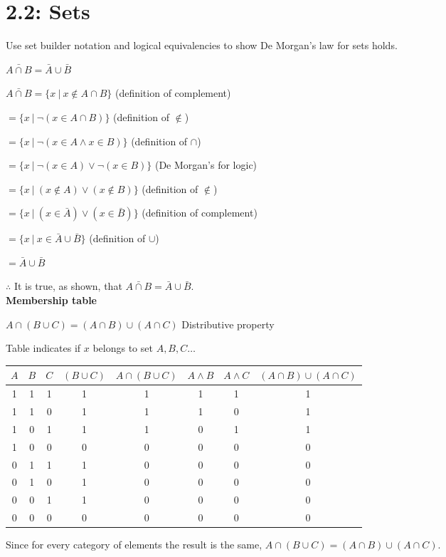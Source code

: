 \documentclass{exam}
\begin{document}
	
	\section{2.2: Sets}
	
	Use set builder notation and logical equivalencies to show De Morgan's law for sets holds.
	
	$\bar{A \cap B} = \bar{A} \cup \bar{B}$ 
	
	$\bar{A \cap B} = \{ x \ |\ x \notin A \cap B\} $  (definition of complement)
	
	$= \{ x \ |\ \neg(x \in A \cap B) \} $ (definition of $\notin$)
	
	$= \{ x \ |\ \neg(x \in A \wedge x \in B) \} $ (definition of $\cap$)
	
	$= \{ x \ |\ \neg(x \in A) \lor \neg(x \in B) \} $ (De Morgan's for logic)
	
	$= \{ x \ |\ (x \notin A) \lor (x \notin B) \} $ (definition of $\notin$)
	
	$= \{ x \ |\ (x \in \bar{A}) \lor (x \in \bar{B}) \} $ (definition of complement)
	
	$= \{ x \ |\ x \in \bar{A} \cup \bar{B} \} $ (definition of $\cup$)
	
	$= \bar{A} \cup \bar{B}$
	
	$\therefore$ It is true, as shown, that $\bar{A \cap B} = \bar{A} \cup \bar{B}$.\\
	
	\textbf{Membership table}
	
	$A \cap (B \cup C) = (A \cap B) \cup (A \cap C)$ Distributive property
	
	Table indicates if $x$ belongs to set $A, B, C \dots$
	
	\begin{tabular}{c|c|c|c|c|c|c|c}
		$A$&$B$&$C$&$(B \cup C)$&$A \cap (B \cup C)$&$A \wedge B$&$A \wedge C$&$(A \cap B) \cup (A \cap C)$\\
		\hline
		1&1&1&1&1&1&1&1\\
		1&1&0&1&1&1&0&1\\
		1&0&1&1&1&0&1&1\\
		1&0&0&0&0&0&0&0\\
		0&1&1&1&0&0&0&0\\
		0&1&0&1&0&0&0&0\\
		0&0&1&1&0&0&0&0\\
		0&0&0&0&0&0&0&0\\
	\end{tabular}
	
	Since for every category of elements the result is the same, $A \cap (B \cup C) = (A \cap B) \cup (A \cap C)$.
	
\end{document}
